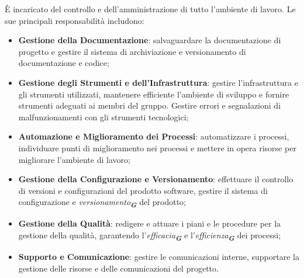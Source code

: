È incaricato del controllo e dell’amministrazione di tutto l’ambiente di lavoro. Le sue principali responsabilità includono:
\begin{itemize}
    \item \textbf{Gestione della Documentazione}: salvaguardare la documentazione di progetto e gestire il sistema di archiviazione e versionamento di documentazione e codice;
    \item \textbf{Gestione degli Strumenti e dell'Infrastruttura}: gestire l’infrastruttura e gli strumenti utilizzati, mantenere efficiente l’ambiente di sviluppo e fornire strumenti adeguati ai membri del gruppo. Gestire errori e segnalazioni di malfunzionamenti con gli strumenti tecnologici;
    \item \textbf{Automazione e Miglioramento dei Processi}: automatizzare i processi, individuare punti di miglioramento nei processi e mettere in opera risorse per migliorare l’ambiente di lavoro;
    \item \textbf{Gestione della Configurazione e Versionamento}: effettuare il controllo di versioni e configurazioni del prodotto software, gestire il sistema di configurazione e \emph{versionamento}\textsubscript{\textit{\textbf{G}}} del prodotto;
    \item \textbf{Gestione della Qualità}: redigere e attuare i piani e le procedure per la gestione della qualità, garantendo l’\emph{efficacia}\textsubscript{\textit{\textbf{G}}} e l’\emph{efficienza}\textsubscript{\textit{\textbf{G}}} dei processi;
    \item \textbf{Supporto e Comunicazione}: gestire le comunicazioni interne, supportare la gestione delle risorse e delle comunicazioni del progetto.
\end{itemize}

